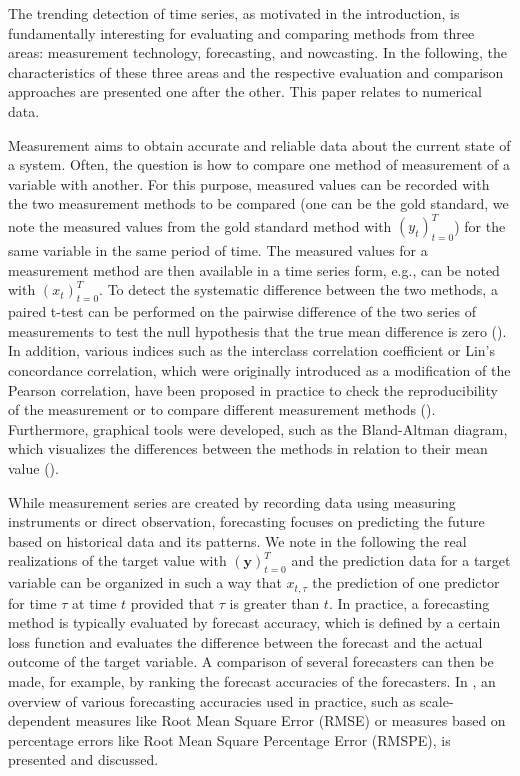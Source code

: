 
The trending detection of time series, as motivated in the introduction, is fundamentally interesting for evaluating and comparing methods from three areas: measurement technology, forecasting, and nowcasting. In the following, the characteristics of these three areas and the respective evaluation and comparison approaches are presented one after the other.
This paper relates to numerical data.  

Measurement aims to obtain accurate and reliable data about the current state of a system.
Often, the question is how to compare one method of measurement of a variable with another.
For this purpose, measured values can be recorded with the two measurement methods to be compared (one can be the gold standard, we note the measured values from the gold standard method with $(y_t)^T_{t=0}$) for the same variable in the same period of time.
The measured values for a measurement method are then available in a time series form, e.g., can be noted with $(x_t)^T_{t=0}$. 
To detect the systematic difference between the two methods, a paired t-test can be performed on the pairwise difference of the two series of measurements to test the null hypothesis that the true mean difference is zero (\cite{watson2010method}).
In addition, various indices such as the interclass correlation coefficient or Lin's concordance correlation, which were originally introduced as a modification of the Pearson correlation, have been proposed in practice to check the reproducibility of the measurement or to compare different measurement methods (\cite{lawrence1989concordance,koo2016guideline,}). 
Furthermore, graphical tools were developed, such as the Bland-Altman diagram, which visualizes the differences between the methods in relation to their mean value (\cite{bland1986statistical}).

While measurement series are created by recording data using measuring instruments or direct observation, forecasting focuses on predicting the future based on historical data and its patterns. We note in the following the real realizations of the target value with $(\mathbf{y})^T_{t=0}$ and the prediction data for a target variable can be organized in such a way that $x_{t,\tau}$ the prediction of one predictor for time $\tau$ at time $t$ provided that $\tau$ is greater than $t$. 
In practice, a forecasting method is typically evaluated by forecast accuracy, which is defined by a certain loss function and evaluates the difference between the forecast and the actual outcome of the target variable.
A comparison of several forecasters can then be made, for example, by ranking the forecast accuracies of the forecasters.
In \cite{hyndman2006another}, an overview of various forecasting accuracies used in practice, such as scale-dependent measures like Root Mean Square Error (RMSE) or measures based on percentage errors like Root Mean Square Percentage Error (RMSPE), is presented and discussed. 

